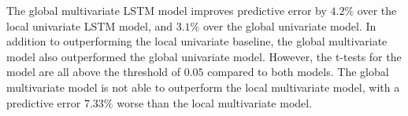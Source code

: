 The global multivariate LSTM model improves predictive error by $4.2\%$ over the local univariate LSTM model,
and $3.1\%$ over the global univariate model.
In addition to outperforming the local univariate baseline, the global multivariate model also outperformed the global univariate model.
However, the t-tests for the model are all above the threshold of $0.05$ compared to both models.
The global multivariate model is not able to outperform the local multivariate model,
with a predictive error $7.33\%$ worse than the local multivariate model.








%
%
%
%
%
%
%
%
%